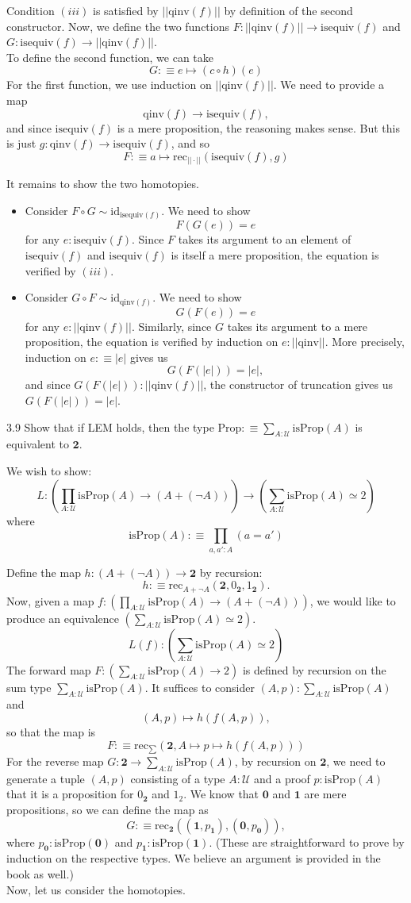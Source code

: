 \documentclass[14pt]{extarticle}
\newcommand{\0}{{\mathbf 0}}
\newcommand{\1}{{\mathbf 1}}
\newcommand{\2}{{\mathbf 2}}
\newcommand{\UU}{{\mathcal U}}
\newcommand{\mt}{\mapsto}
\newcommand{\rec}{\mathrm{rec}}
\newcommand{\id}{\mathrm{id}}
\newcommand{\isequiv}{\mathrm{isequiv}}
\newcommand{\qinv}{\mathrm{qinv}}
\newcommand{\isProp}{\mathrm{isProp}}
\begin{document}
Condition $(iii)$ is satisfied by $||\qinv(f)||$ by definition of the second constructor. Now, we define the two functions $F : ||\qinv(f)|| \to \isequiv(f)$ and $G : \isequiv(f) \to ||\qinv(f)||$.\\
To define the second function, we can take
\[G :\equiv e \mt (c \circ h)(e)\]
For the first function, we use induction on $||\qinv(f)||$. We need to provide a map
\[\qinv(f) \to \isequiv(f),\] and since $\isequiv(f)$ is a mere proposition, the reasoning makes sense. But this is just $g : \qinv(f) \to \isequiv(f)$, and so
\[F :\equiv a \mt \rec_{||\cdot||}(\isequiv(f),g)\]

It remains to show the two homotopies.

\begin{itemize}
\item Consider $F \circ G \sim \id_{\isequiv(f)}$. We need to show
\[F(G(e)) = e\] for any $e : \isequiv(f)$. Since $F$ takes its argument to an element of $\isequiv(f)$ and $\isequiv(f)$ is itself a mere proposition, the equation is verified by $(iii)$.

\item Consider $G \circ F \sim \id_{\qinv(f)}$. We need to show
\[G(F(e)) = e\] for any $e : ||\qinv(f)||$. Similarly, since $G$ takes its argument to a mere proposition, the equation is verified by induction on $e : ||\qinv||$. More precisely, induction on $e :\equiv |e|$ gives us
\[G(F(|e|)) = |e|,\] and since $G(F(|e|)) : ||\qinv(f)||$, the constructor of truncation gives us $G(F(|e|)) = |e|$.
\end{itemize}

\begin{prob}{3.9}{}
Show that if LEM holds, then the type $\text{Prop} :\equiv \sum_{A:\UU} \isProp(A)$ is equivalent to $\2$.
\end{prob}
We wish to show:
\[L : \left(\prod_{A:\UU}\isProp(A) \to (A + (\neg A)) \right) \to \left(\sum_{A : \UU}\isProp(A) \simeq 2 \right)\]
where \[\isProp(A) :\equiv \prod_{a,a':A}(a = a')\]

Define the map $h : (A + (\neg A)) \to \2$ by recursion:
\[h :\equiv \rec_{A + \neg A}(\2, 0_\2, 1_\2).\] Now, given a map $f : \left(\prod_{A:\UU}\isProp(A) \to (A + (\neg A)) \right)$, we would like to produce an equivalence $\left(\sum_{A : \UU}\isProp(A) \simeq 2 \right)$.
\[L(f) : \left(\sum_{A : \UU}\isProp(A) \simeq 2 \right)\] The forward map $F : \left(\sum_{A : \UU}\isProp(A) \to 2 \right)$ is defined by recursion on the sum type $\sum_{A : \UU}\isProp(A)$. It suffices to consider $(A,p) :\sum_{A : \UU}\isProp(A)$ and
\[(A,p) \mt h(f(A,p)),\] so that the map is
\[F : \equiv \rec_{\sum}(\2,A \mt p \mt h(f(A,p)))\]
For the reverse map $G : \2 \to \sum_{A:\UU}\isProp(A)$, by recursion on $\2$, we need to generate a tuple $(A,p)$ consisting of a type $A : \UU$ and a proof $p:\isProp(A)$ that it is a proposition for $0_\2$ and $1_2$. We know that $\0$ and $\1$ are mere propositions, so we can define the map as
\[G :\equiv \rec_\2((\1,p_\1), (\0,p_\0)),\] where $p_\0 : \isProp(\0)$ and $p_\1 : \isProp(\1)$. (These are straightforward to prove by induction on the respective types. We believe an argument is provided in the book as well.)\\
Now, let us consider the homotopies.
\end{document}
